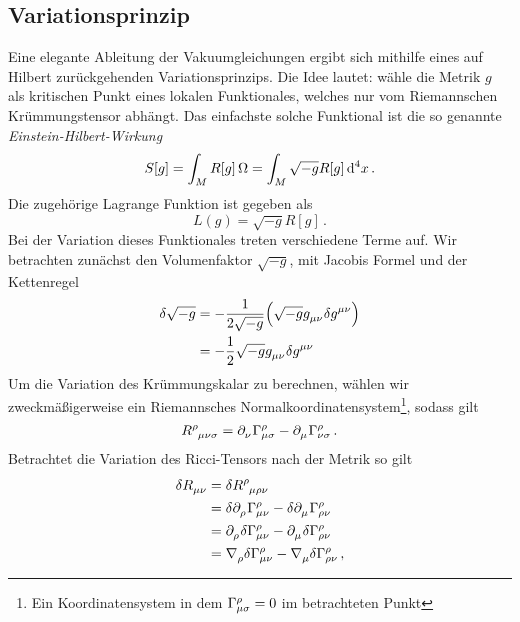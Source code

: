 \subsection{Variationsprinzip}
Eine elegante Ableitung der Vakuumgleichungen ergibt sich mithilfe eines auf
Hilbert zurückgehenden Variationsprinzips.
Die Idee lautet: wähle die Metrik $g$ als kritischen
Punkt eines lokalen Funktionales, welches nur vom Riemannschen Krümmungstensor
abhängt.
Das einfachste solche Funktional ist die so genannte
\emph{Einstein-Hilbert-Wirkung}
\begin{equation}
S[g]=\int_{M}R[g]\,\Omega = \int_{M}\sqrt{-g}R[g] \dif{}^4x \,.
\end{equation}
Die zugehörige Lagrange Funktion ist gegeben als
\begin{equation}
L(g)=\sqrt{-g}R[g]\,.
\end{equation}
Bei der Variation dieses Funktionales treten verschiedene Terme auf. Wir
betrachten zunächst den Volumenfaktor $\sqrt{-g}$, mit Jacobis Formel und der
Kettenregel
\begin{equation}
\begin{split}
\delta \sqrt{-g}
&= -\frac{1}{2\sqrt{-g}}  \left(\sqrt{-g}\tensor{g}{_\mu_\nu}
\delta\tensor{g}{^\mu^\nu} \right)\\
&= -\frac{1}{2}\sqrt{-g}\tensor{g}{_\mu_\nu}
\delta\tensor{g}{^\mu^\nu} \\
\end{split}
\end{equation}
Um die Variation des Krümmungskalar zu berechnen, wählen wir zweckmäßigerweise
ein Riemannsches Normalkoordinatensystem\footnote{Ein Koordinatensystem in dem
$\cSym{\rho}{\mu}{\sigma}=0$ im betrachteten Punkt}, sodass gilt
\begin{equation}
\tensor{R}{^\rho_\mu_\nu_\sigma}=\tensor{\partial}{_\nu}\cSym{\rho}{\mu}{\sigma}
-\tensor{\partial}{_\mu}\cSym{\rho}{\nu}{\sigma}\,.\\
\end{equation}
Betrachtet die Variation des Ricci-Tensors nach der Metrik so gilt
\begin{equation}
\begin{split}
\delta \tensor{R}{_\mu_\nu}
&=\delta \tensor{R}{^\rho_\mu_\rho_\nu}\\
&=\delta\tensor{\partial}{_\rho} \cSym{\rho}{\mu}{\nu}
-\delta\tensor{\partial}{_\mu} \cSym{\rho}{\rho}{\nu}\\
&=\tensor{\partial}{_\rho}\delta \cSym{\rho}{\mu}{\nu}
-\tensor{\partial}{_\mu}\delta \cSym{\rho}{\rho}{\nu}\\
&=\tensor{\nabla}{_\rho}\delta \cSym{\rho}{\mu}{\nu}
-\tensor{\nabla}{_\mu}\delta \cSym{\rho}{\rho}{\nu}\,,
\end{split}
\end{equation}
